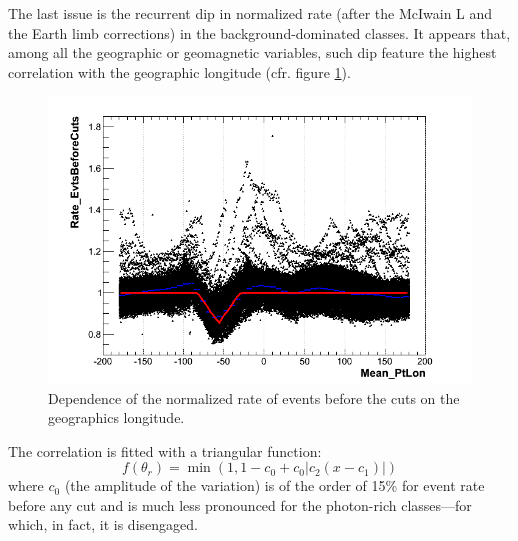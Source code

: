 \documentclass[a4paper,twocolumn]{article}
\begin{document}
The last issue is the recurrent dip in normalized rate (after the McIwain L and
the Earth limb corrections) in the background-dominated classes.
It appears that, among all the geographic or geomagnetic variables, such dip
feature the highest correlation with the geographic longitude
(cfr. figure \ref{EvtsBeforeCuts_lon}).
\begin{figure}[htb!]
  \begin{center}
    \includegraphics[width=\linewidth]{figures/EvtsBeforeCuts_lon}
    \caption{Dependence of the normalized rate of events before the cuts
      on the geographics longitude.}
    \label{EvtsBeforeCuts_lon}
  \end{center}
\end{figure}

The correlation is fitted with a triangular function:
\begin{equation}
  f(\theta_r) = \min\left(1, 1 - c_0 + c_0 |c_2 (x - c_1)|\right)
\end{equation}
where $c_0$ (the amplitude of the variation) is of the order of 15\% for
event rate before any cut and is much less pronounced for the photon-rich
classes---for which, in fact, it is disengaged.
\end{document}
